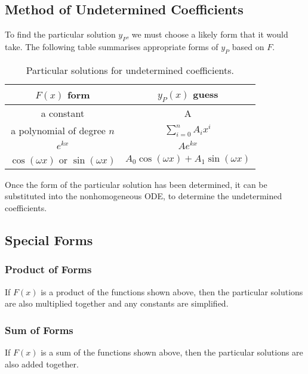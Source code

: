 \documentclass{article}
\begin{document}
\subsection{Method of Undetermined Coefficients}
To find the particular solution \(y_P\), we must choose a likely form
that it would take. The following table summarises appropriate forms of
\(y_P\) based on \(F\).
\begin{table}[H]
    \centering
    \begin{tabular}{c c}
        \toprule
        \(F\left( x \right)\) form                                             & \(y_P\left( x \right)\) guess                                             \\
        \midrule
        a constant                                                             & A                                                                         \\
        a polynomial of degree \(n\)                                           & \(\displaystyle \sum_{i = 0}^n A_i x^i\)                                  \\
        \(e^{kx}\)                                                             & \(A e^{kx}\)                                                              \\
        \(\cos{\left( \omega x \right)}\) or \(\sin{\left( \omega x \right)}\) & \(A_0 \cos{\left( \omega x \right)} + A_1 \sin{\left( \omega x \right)}\) \\
        \bottomrule
    \end{tabular}
    \caption{Particular solutions for undetermined coefficients.}
\end{table}
Once the form of the particular solution has been determined, it can be
substituted into the nonhomogeneous ODE, to determine the undetermined
coefficients.
\subsection{Special Forms}
\subsubsection{Product of Forms}
If \(F\left( x \right)\) is a product of the functions shown above,
then the particular solutions are also multiplied together and any
constants are simplified.
\subsubsection{Sum of Forms}
If \(F\left( x \right)\) is a sum of the functions shown above, then
the particular solutions are also added together.
\end{document}
